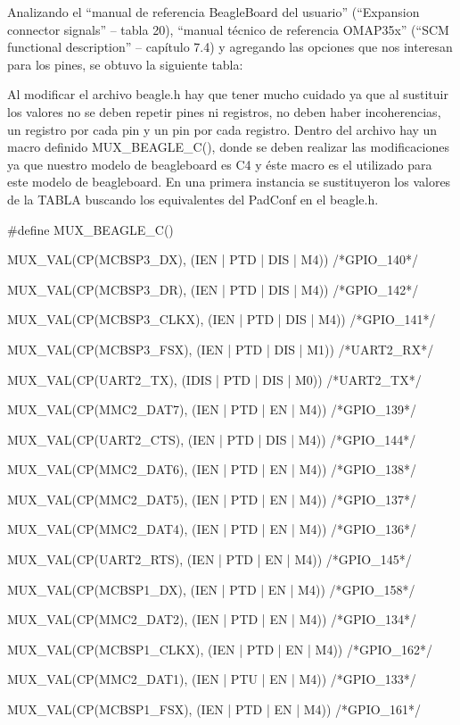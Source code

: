 Analizando el “manual de referencia BeagleBoard del usuario” (“Expansion connector signals” – 
tabla 20), “manual técnico de referencia OMAP35x” (“SCM functional description” – capítulo 7.4) 
y agregando las opciones que nos interesan para los pines, se obtuvo la siguiente tabla: 

Al modificar el archivo beagle.h hay que tener mucho cuidado ya que al sustituir los valores no se deben repetir pines ni registros, no deben haber incoherencias, un registro por cada pin y un pin por cada registro. 
Dentro del archivo hay un macro definido MUX\_BEAGLE\_C(), donde se deben realizar las modificaciones ya que nuestro modelo de beagleboard es C4 y éste macro es el utilizado para este modelo de beagleboard.
En una primera instancia se sustituyeron los valores de la TABLA buscando los equivalentes del 
PadConf en el beagle.h. 

\#define MUX\_BEAGLE\_C() \ 

MUX\_VAL(CP(MCBSP3\_DX),	(IEN  | PTD | DIS | M4)) /*GPIO\_140*/\ 

MUX\_VAL(CP(MCBSP3\_DR),	(IEN  | PTD | DIS | M4)) /*GPIO\_142*/\ 

MUX\_VAL(CP(MCBSP3\_CLKX),	(IEN  | PTD | DIS | M4)) /*GPIO\_141*/\ 

MUX\_VAL(CP(MCBSP3\_FSX),	(IEN  | PTD | DIS | M1)) /*UART2\_RX*/\ 

MUX\_VAL(CP(UART2\_TX),		(IDIS | PTD | DIS | M0)) /*UART2\_TX*/\ 

MUX\_VAL(CP(MMC2\_DAT7),	(IEN  | PTD | EN  | M4)) /*GPIO\_139*/\ 

MUX\_VAL(CP(UART2\_CTS),	(IEN  | PTD | DIS | M4)) /*GPIO\_144*/\ 

MUX\_VAL(CP(MMC2\_DAT6),	(IEN  | PTD | EN  | M4)) /*GPIO\_138*/\ 

MUX\_VAL(CP(MMC2\_DAT5),	(IEN  | PTD | EN  | M4)) /*GPIO\_137*/\ 

MUX\_VAL(CP(MMC2\_DAT4),	(IEN  | PTD | EN  | M4)) /*GPIO\_136*/\ 

MUX\_VAL(CP(UART2\_RTS),	(IEN  | PTD | EN  | M4)) /*GPIO\_145*/\ 

MUX\_VAL(CP(MCBSP1\_DX),	(IEN  | PTD | EN  | M4)) /*GPIO\_158*/\ 

MUX\_VAL(CP(MMC2\_DAT2),	(IEN  | PTD | EN  | M4)) /*GPIO\_134*/\ 

MUX\_VAL(CP(MCBSP1\_CLKX),	(IEN  | PTD | EN  | M4)) /*GPIO\_162*/\ 

MUX\_VAL(CP(MMC2\_DAT1),	(IEN  | PTU | EN  | M4)) /*GPIO\_133*/\ 

MUX\_VAL(CP(MCBSP1\_FSX),	(IEN  | PTD | EN  | M4)) /*GPIO\_161*/\ 

